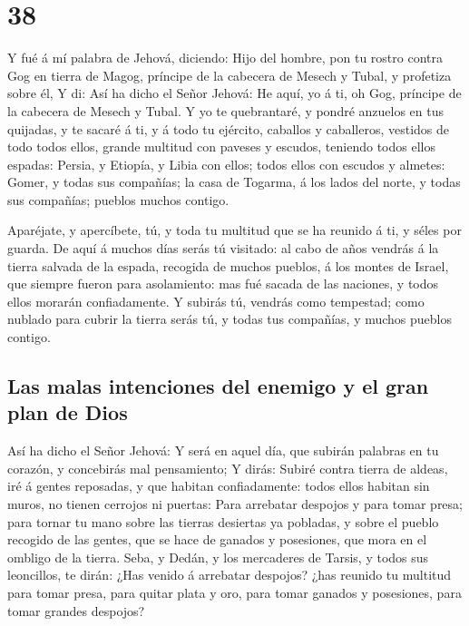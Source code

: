 \hypertarget{section-37}{%
\section{38}\label{section-37}}

 Y fué á mí palabra de Jehová, diciendo:  Hijo
del hombre, pon tu rostro contra Gog en tierra de Magog, príncipe de la
cabecera de Mesech y Tubal, y profetiza sobre él,  Y di: Así
ha dicho el Señor Jehová: He aquí, yo á ti, oh Gog, príncipe de la
cabecera de Mesech y Tubal.  Y yo te quebrantaré, y pondré
anzuelos en tus quijadas, y te sacaré á ti, y á todo tu ejército,
caballos y caballeros, vestidos de todo todos ellos, grande multitud con
paveses y escudos, teniendo todos ellos espadas:  Persia, y
Etiopía, y Libia con ellos; todos ellos con escudos y almetes:
 Gomer, y todas sus compañías; la casa de Togarma, á los
lados del norte, y todas sus compañías; pueblos muchos contigo.

 Aparéjate, y apercíbete, tú, y toda tu multitud que se ha
reunido á ti, y séles por guarda.  De aquí á muchos días
serás tú visitado: al cabo de años vendrás á la tierra salvada de la
espada, recogida de muchos pueblos, á los montes de Israel, que siempre
fueron para asolamiento: mas fué sacada de las naciones, y todos ellos
morarán confiadamente.  Y subirás tú, vendrás como
tempestad; como nublado para cubrir la tierra serás tú, y todas tus
compañías, y muchos pueblos contigo.

\hypertarget{las-malas-intenciones-del-enemigo-y-el-gran-plan-de-dios}{%
\subsection{Las malas intenciones del enemigo y el gran plan de
Dios}\label{las-malas-intenciones-del-enemigo-y-el-gran-plan-de-dios}}

 Así ha dicho el Señor Jehová: Y será en aquel día, que
subirán palabras en tu corazón, y concebirás mal pensamiento;
 Y dirás: Subiré contra tierra de aldeas, iré á gentes
reposadas, y que habitan confiadamente: todos ellos habitan sin muros,
no tienen cerrojos ni puertas:  Para arrebatar despojos y
para tomar presa; para tornar tu mano sobre las tierras desiertas ya
pobladas, y sobre el pueblo recogido de las gentes, que se hace de
ganados y posesiones, que mora en el ombligo de la tierra. 
Seba, y Dedán, y los mercaderes de Tarsis, y todos sus leoncillos, te
dirán: ¿Has venido á arrebatar despojos? ¿has reunido tu multitud para
tomar presa, para quitar plata y oro, para tomar ganados y posesiones,
para tomar grandes despojos?

